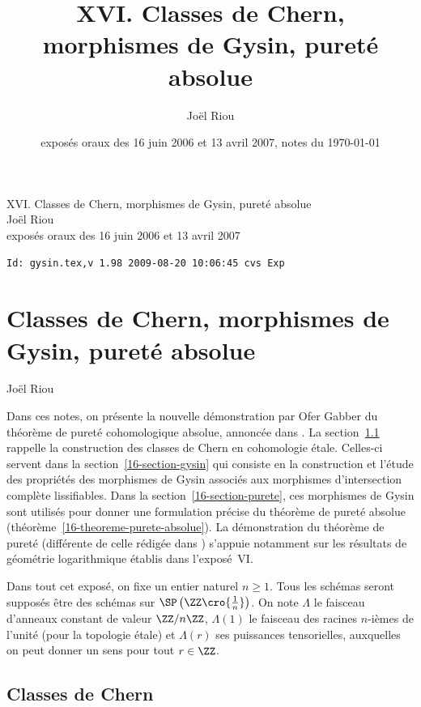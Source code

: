 \documentclass[10pt]{../fichiers-configuration-latex/smfart}
\author{Joël Riou}
\title{XVI. Classes de Chern, morphismes de Gysin, pureté absolue}
\date{exposés oraux des 16 juin 2006 et 13 avril 2007, notes du \today}
\begin{document}
\begin{center}
XVI. Classes de Chern, morphismes de Gysin, pureté absolue\\
Joël Riou\\
exposés oraux des 16 juin 2006 et 13 avril 2007\\
\end{center}

\begin{center}
\verb$Id: gysin.tex,v 1.98 2009-08-20 10:06:45 cvs Exp $
\end{center}

\tableofcontents

\else
{}
\chapter{Classes de Chern, morphismes de Gysin, pureté absolue}
\begin{center}
Joël Riou
\end{center}
\fi

Dans ces notes, on présente la nouvelle démonstration par Ofer Gabber du
théorème de pureté cohomologique absolue, annoncée dans
\cite{ABELIEN@Gabber}. La
section~\ref{16-section-classes-chern} rappelle la construction des classes de
Chern en cohomologie étale. Celles-ci servent dans la
section~\ref{16-section-gysin} qui consiste en la construction et l'étude des
propriétés des morphismes de Gysin associés aux morphismes d'intersection
complète lissifiables. Dans la section~\ref{16-section-purete}, ces morphismes
de Gysin sont utilisés pour donner une formulation précise du théorème de
pureté absolue (théorème~\ref{16-theoreme-purete-absolue}). La démonstration
du théorème de pureté (différente de celle rédigée dans
\cite{AZUMINO@Fujiwara})
s'appuie notamment sur les résultats de géométrie logarithmique établis
dans l'exposé VI.

\bigskip

Dans tout cet exposé, on fixe un entier naturel $n\geq 1$. Tous les schémas
seront supposés être des schémas sur $\SP\left(\ZZ\cro{\frac 1 n}\right)$. On note
$\Lambda$ le faisceau d'anneaux constant de valeur $\ZZ/n\ZZ$, $\Lambda(1)$
le faisceau des racines $n$-ièmes de l'unité (pour la topologie étale)
et $\Lambda(r)$ ses
puissances tensorielles, auxquelles on peut donner un sens pour tout
$r\in\ZZ$.

\section{Classes de Chern}%
\label{16-section-classes-chern}
\end{document}
